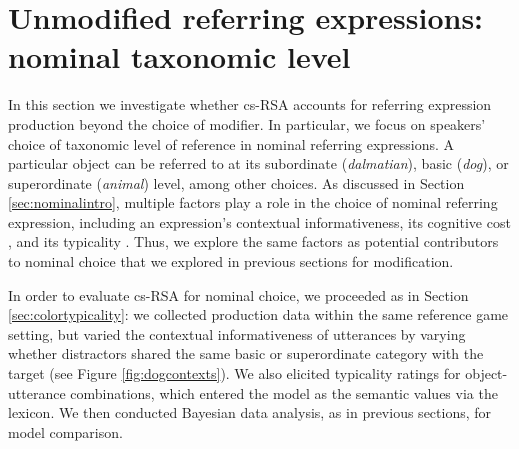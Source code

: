 \documentclass[11pt]{article}
\newcommand{\figref}[1]{Figure \ref{#1}}
\newcommand{\sectionref}[1]{Section \ref{#1}}
\begin{document}
\section[]{Unmodified referring expressions: nominal taxonomic level}
\label{sec:nominal}

In this section we investigate whether cs-RSA accounts for referring expression production beyond the choice of modifier. In particular, we focus on speakers' choice of taxonomic level of reference in nominal referring expressions. A particular object can be referred to at its subordinate (\emph{dalmatian}), basic (\emph{dog}), or superordinate (\emph{animal}) level, among other choices. As discussed in \sectionref{sec:nominalintro},  multiple factors play a role in the choice of nominal referring expression, including an expression's contextual informativeness, its cognitive cost \cite<short and frequent terms are preferred over long and infrequent ones,>{griffin1998,jescheniak1994}, and its typicality \cite<an utterance is more likely to be used if the object is a good instance of it,> {Jolicoeur1984}.
Thus, we explore the same factors as potential contributors to nominal choice that we explored in previous sections for modification.


In order to evaluate cs-RSA for nominal choice, we proceeded as in \sectionref{sec:colortypicality}: we collected production data within the same reference game setting, but varied the contextual informativeness of utterances by varying whether distractors shared the same basic or superordinate category with the target (see \figref{fig:dogcontexts}). We also elicited typicality ratings for object-utterance combinations, which entered the model as the semantic values via the lexicon. We then conducted Bayesian data analysis, as in previous sections, for model comparison.
\end{document}
